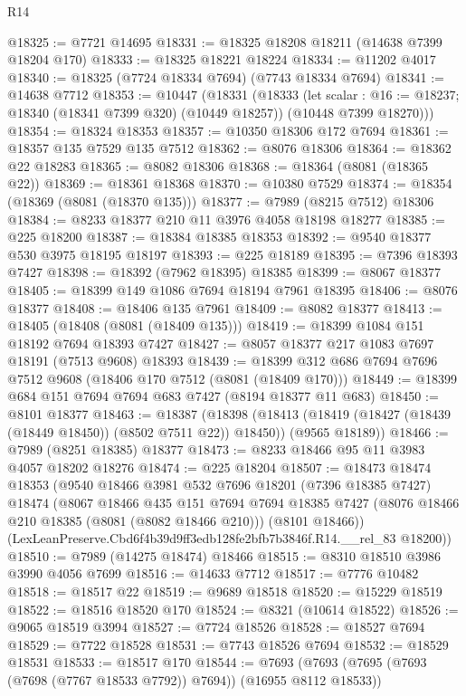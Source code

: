 \begin{lexlean}{R14}
\begin{coremodule}
@18325 := @7721 @14695
@18331 := @18325 @18208 @18211 (@14638 @7399 @18204 @170)
@18333 := @18325 @18221 @18224
@18334 := @11202 @4017
@18340 := @18325 (@7724 @18334 @7694) (@7743 @18334 @7694)
@18341 := @14638 @7712
@18353 := @10447
    (@18331
      (@18333
        (let scalar : @16 := @18237; @18340 (@18341 @7399 @320) (@10449 @18257))
        (@10448 @7399 @18270)))
@18354 := @18324 @18353
@18357 := @10350 @18306 @172 @7694
@18361 := @18357 @135 @7529 @135 @7512
@18362 := @8076 @18306
@18364 := @18362 @22 @18283
@18365 := @8082 @18306
@18368 := @18364 (@8081 (@18365 @22))
@18369 := @18361 @18368
@18370 := @10380 @7529
@18374 := @18354 (@18369 (@8081 (@18370 @135)))
@18377 := @7989 (@8215 @7512) @18306
@18384 := @8233 @18377 @210 @11 @3976 @4058 @18198 @18277
@18385 := @225 @18200
@18387 := @18384 @18385 @18353
@18392 := @9540 @18377 @530 @3975 @18195 @18197
@18393 := @225 @18189
@18395 := @7396 @18393 @7427
@18398 := @18392 (@7962 @18395) @18385
@18399 := @8067 @18377
@18405 := @18399 @149 @1086 @7694 @18194 @7961 @18395
@18406 := @8076 @18377
@18408 := @18406 @135 @7961
@18409 := @8082 @18377
@18413 := @18405 (@18408 (@8081 (@18409 @135)))
@18419 := @18399 @1084 @151 @18192 @7694 @18393 @7427
@18427 := @8057 @18377 @217 @1083 @7697 @18191 (@7513 @9608) @18393
@18439 := @18399 @312 @686 @7694 @7696 @7512 @9608 (@18406 @170 @7512 (@8081 (@18409 @170)))
@18449 := @18399 @684 @151 @7694 @7694 @683 @7427 (@8194 @18377 @11 @683)
@18450 := @8101 @18377
@18463 := @18387
    (@18398
      (@18413 (@18419 (@18427 (@18439 (@18449 @18450)) (@8502 @7511 @22)) @18450))
      (@9565 @18189))
@18466 := @7989 (@8251 @18385) @18377
@18473 := @8233 @18466 @95 @11 @3983 @4057 @18202 @18276
@18474 := @225 @18204
@18507 := @18473
    @18474
    @18353
    (@9540
      @18466
      @3981
      @532
      @7696
      @18201
      (@7396 @18385 @7427)
      @18474
      (@8067
        @18466
        @435
        @151
        @7694
        @7694
        @18385
        @7427
        (@8076 @18466 @210 @18385 (@8081 (@8082 @18466 @210)))
        (@8101 @18466))
      (LexLeanPreserve.Cbd6f4b39d9ff3edb128fe2bfb7b3846f.R14.__rel_83 @18200))
@18510 := @7989 (@14275 @18474) @18466
@18515 := @8310 @18510 @3986 @3990 @4056 @7699
@18516 := @14633 @7712
@18517 := @7776 @10482
@18518 := @18517 @22
@18519 := @9689 @18518
@18520 := @15229 @18519
@18522 := @18516 @18520 @170
@18524 := @8321 (@10614 @18522)
@18526 := @9065 @18519 @3994
@18527 := @7724 @18526
@18528 := @18527 @7694
@18529 := @7722 @18528
@18531 := @7743 @18526 @7694
@18532 := @18529 @18531
@18533 := @18517 @170
@18544 := @7693 (@7693 (@7695 (@7693 (@7698 (@7767 @18533 @7792)) @7694)) (@16955 @8112 @18533))

\end{coremodule}
\end{lexlean}
